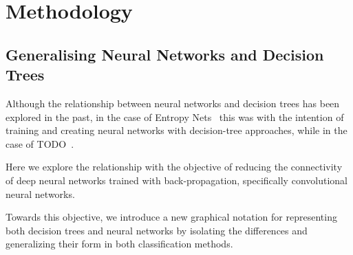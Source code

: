 \chapter{Methodology}
\label{methodology}
\ifpdf
    \graphicspath{{Chapter3/Figs/Raster/}{Chapter3/Figs/PDF/}{Chapter3/Figs/}}
\else
    \graphicspath{{Chapter3/Figs/Vector/}{Chapter3/Figs/}}
\fi

\section{Generalising Neural Networks and Decision Trees}
Although the relationship between neural networks and decision trees has been explored in the past, in the case of Entropy Nets~\cite{Sethi1990} this was with the intention of training and creating neural networks with decision-tree approaches, while in the case of TODO~\cite{Welbl2014casting}.

Here we explore the relationship with the objective of reducing the connectivity of deep neural networks trained with back-propagation, specifically convolutional neural networks. 

Towards this objective, we introduce a new graphical notation for representing both decision trees and neural networks by isolating the differences and generalizing their form in both classification methods. 